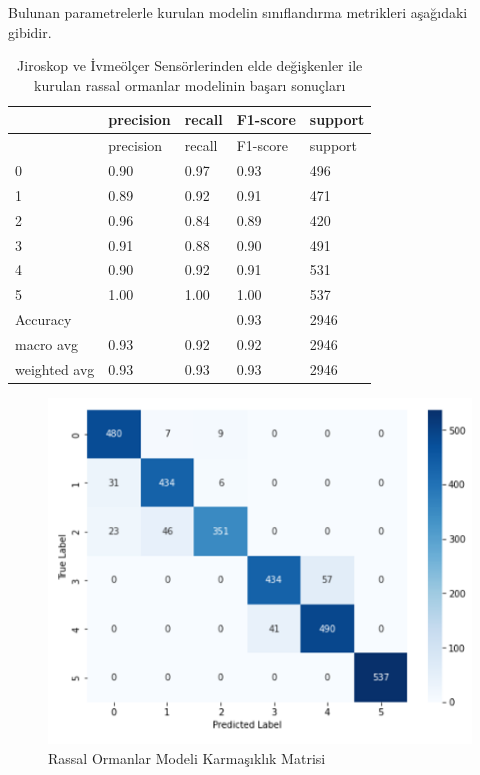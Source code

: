 \documentclass[12pt,twoside]{deuthesis}
\begin{document}
Bulunan parametrelerle kurulan modelin sınıflandırma metrikleri aşağıdaki gibidir.
\begin{longtable}[]{@{}lllll@{}}
\caption{\label{tab:jirf} Jiroskop ve İvmeölçer Sensörlerinden elde değişkenler ile kurulan rassal ormanlar modelinin başarı sonuçları}\tabularnewline
\toprule()
& precision & recall & F1-score & support \\
\midrule()
\endfirsthead
\toprule()
& precision & recall & F1-score & support \\
\midrule()
\endhead
0 & 0.90 & 0.97 & 0.93 & 496 \\
1 & 0.89 & 0.92 & 0.91 & 471 \\
2 & 0.96 & 0.84 & 0.89 & 420 \\
3 & 0.91 & 0.88 & 0.90 & 491 \\
4 & 0.90 & 0.92 & 0.91 & 531 \\
5 & 1.00 & 1.00 & 1.00 & 537 \\
Accuracy & & & 0.93 & 2946 \\
macro avg & 0.93 & 0.92 & 0.92 & 2946 \\
weighted avg & 0.93 & 0.93 & 0.93 & 2946 \\
\bottomrule()
\end{longtable}
\begin{figure}

{\centering \includegraphics[width=0.9\linewidth,height=0.35\textheight]{figure/ji_random_forest_confmat} 

}

\caption{Rassal Ormanlar Modeli Karmaşıklık Matrisi}\label{fig:jirandomforestconfmat}
\end{figure}
\end{document}
